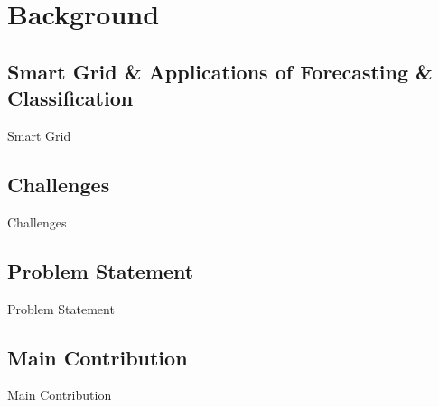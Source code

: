 \section{Background}
\subsection{Smart Grid \& Applications of Forecasting \& Classification }
\begin{frame}[allowframebreaks]{Smart Grid}

\end{frame}


\subsection{Challenges}
\begin{frame}[allowframebreaks]{Challenges}

\end{frame}


\subsection{Problem Statement}
\begin{frame}{Problem Statement}

\end{frame}


\subsection{Main Contribution}
\begin{frame}{Main Contribution}
\end{frame}
